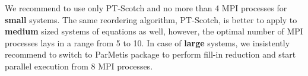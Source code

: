 We recommend to use only PT-Scotch and no more than 4 MPI processes for \textbf{small} systems. The same reordering algorithm, PT-Scotch, is better to apply to \textbf{medium} sized systems of equations as well, however, the optimal number of MPI processes lays in a range from 5 to 10. In case of \textbf{large} systems, we insistently recommend to switch to ParMetis package to perform fill-in reduction and start parallel execution from 8 MPI processes.\\




